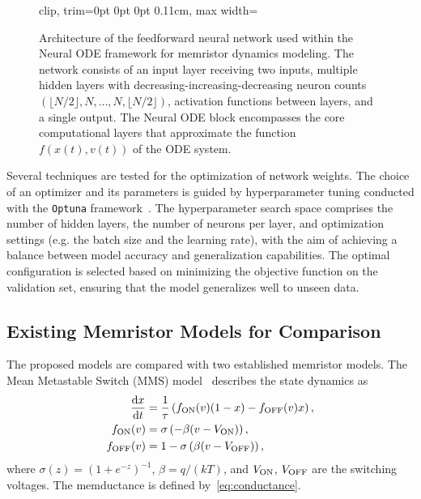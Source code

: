 \documentclass[a4,journal]{IEEEtran}
\newcommand{\von}{V_{\rm ON}}
\newcommand{\voff}{V_{\rm OFF}}
\newcommand{\ua}{v}
\newcommand{\xw}{x}
\newcommand{\dert}[1]{\frac{{\rm d} {#1}}{{\rm d} t} }
\begin{document}
\begin{figure}[ht!]
  \centering

  \begin{adjustbox}{clip, trim=0pt 0pt 0pt 0.11cm, max width=\columnwidth}
    
  \end{adjustbox}
  \caption{Architecture of the feedforward neural network used within the Neural ODE framework for memristor dynamics modeling. The network consists of an input layer receiving two inputs, multiple hidden layers with decreasing-increasing-decreasing neuron counts \(\left(\lfloor N/2 \rfloor, N,\ldots,N, \lfloor N/2 \rfloor\right)\), activation functions between layers, and a single output. The Neural ODE block encompasses the core computational layers that approximate the function \(f(\xw(t), \ua(t))\) of the ODE system.}

  \label{fig:nn-arch}
\end{figure}

Several techniques are tested for the optimization of network weights. The choice of an optimizer and its parameters is guided by hyperparameter tuning conducted with the \texttt{Optuna} framework~\cite{Akiba2019}. The hyperparameter search space comprises the number of hidden layers, the number of neurons per layer, and optimization settings (e.g. the batch size and the learning rate), with the aim of achieving a balance between model accuracy and generalization capabilities.
The optimal configuration is selected based on minimizing the objective function on the validation set, ensuring that the model generalizes well to unseen data.
\subsection{Existing Memristor Models for Comparison}

\noindent The proposed models are compared with two established  memristor models. The Mean Metastable Switch (MMS) model~\cite{Minati2020} describes the state dynamics as
\begin{align}
  \label{eq:mms}
  \dert{x}       & = \frac{1}{\tau} \left( f_{\rm ON}(\ua) (1-x) - f_{\rm OFF}(\ua) x \right), \\
  f_{\rm ON}(\ua)  & = \sigma\left(-\beta (\ua-\von)\right), \label{eq:mms5b} \\
  f_{\rm OFF}(\ua) & = 1 - \sigma\left(\beta (\ua-\voff)\right), \label{eq:mms5c}
\end{align}
where \(\sigma(z) = (1+e^{-z})^{-1}\), \(\beta = q/(kT)\), and \(\von\), \(\voff\) are the switching voltages. The memductance is defined by~\eqref{eq:conductance}.
\end{document}
